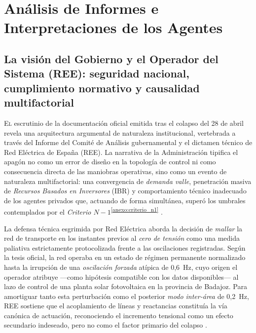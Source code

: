 
\chapter{Análisis de Informes e Interpretaciones de los Agentes}
\label{cap:analisis_informes}

\section{La visión del Gobierno y el Operador del Sistema (REE): seguridad nacional, cumplimiento normativo y causalidad multifactorial}
\label{sec:vision_gobierno}

\lettrine[lines=3, lhang=0.1]{E}{l} escrutinio de la documentación oficial emitida tras el colapso del 28 de
abril revela una arquitectura argumental de naturaleza institucional,
vertebrada a través del Informe del Comité de Análisis gubernamental y el
dictamen técnico de Red Eléctrica de España (REE). La narrativa de la
Administración tipifica el apagón no como un error de diseño en la topología
de control ni como consecuencia directa de las maniobras operativas, sino
como un evento de naturaleza multifactorial: una convergencia de
\textit{demanda valle}, penetración masiva de \textit{Recursos Basados en
Inversores} (IBR) y comportamiento técnico inadecuado de los agentes
privados que, actuando de forma simultánea, superó los umbrales contemplados
por el \textit{Criterio $N-1$}\textsuperscript{\ref{anexo:criterio_n1}}
\cite{gobierno2025,ree2025}.

La defensa técnica esgrimida por Red Eléctrica aborda la decisión de
\textit{mallar} la red de transporte en los instantes previos al
\textit{cero de tensión} como una medida paliativa estrictamente
protocolizada frente a las oscilaciones registradas. Según la tesis oficial,
la red operaba en un estado de régimen permanente normalizado hasta la
irrupción de una \textit{oscilación forzada} atípica de 0,6~Hz, cuyo origen
el operador atribuye ---como hipótesis compatible con los datos
disponibles--- al lazo de control de una planta solar fotovoltaica en la
provincia de Badajoz. Para amortiguar tanto esta perturbación como el
posterior \textit{modo inter-área} de 0,2~Hz, REE sostiene que el
acoplamiento de líneas y reactancias constituía la vía canónica de
actuación, reconociendo el incremento tensional como un efecto secundario
indeseado, pero no como el factor primario del colapso
\cite{gobierno2025,ree2025}.


